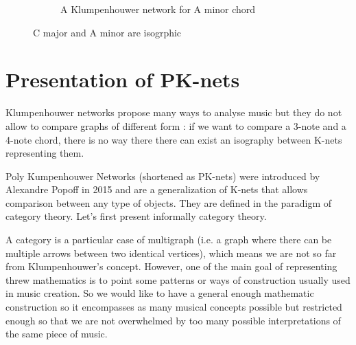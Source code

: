 \begin{exmp}
\begin{figure}[ht]
\begin{subfigure}{.29\textwidth}
            \caption{A Klumpenhouwer network for A minor chord}
            \label{fig:KAminor}
        \end{subfigure}
        \caption{C major and A minor are isogrphic}
        \label{fig:Kisography}
    \end{figure}
\end{exmp}




\section{Presentation of PK-nets}
Klumpenhouwer networks propose many ways to analyse music but they do not allow to compare graphs of different form : if we want to compare a 3-note and a 4-note chord, there is no way there there can exist an isography between K-nets representing them.

Poly Kumpenhouwer Networks\cite{PAAE2016} (shortened as PK-nets) were introduced by Alexandre Popoff in 2015\cite{popoff2015categorical} and are a generalization of K-nets that allows comparison between any type of objects. They are defined in the paradigm of category theory. Let's first present informally category theory.

A category is a particular case of multigraph (i.e. a graph where there can be multiple arrows between two identical vertices), which means we are not so far from Klumpenhouwer's concept. However, one of the main goal of representing threw mathematics is to point some patterns or ways of construction usually used in music creation. So we would like to have a general enough mathematic construction so it encompasses as many musical concepts possible but restricted enough so that we are not overwhelmed by too many possible interpretations of the same piece of music.


